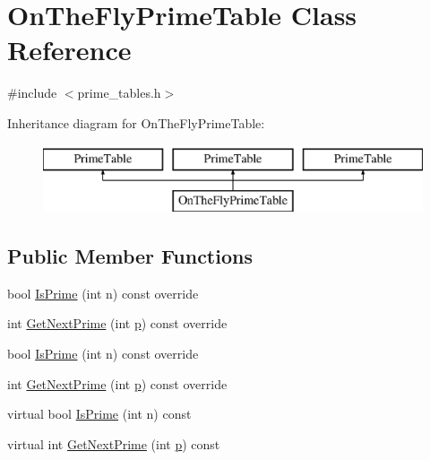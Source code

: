 \hypertarget{class_on_the_fly_prime_table}{}\section{On\+The\+Fly\+Prime\+Table Class Reference}
\label{class_on_the_fly_prime_table}


{\ttfamily \#include $<$prime\+\_\+tables.\+h$>$}

Inheritance diagram for On\+The\+Fly\+Prime\+Table\+:\begin{figure}[H]
\begin{center}
\leavevmode
\includegraphics[height=2.000000cm]{d3/d31/class_on_the_fly_prime_table}
\end{center}
\end{figure}
\subsection*{Public Member Functions}
\begin{DoxyCompactItemize}
\item 
bool \mbox{\hyperlink{class_on_the_fly_prime_table_ac8236514299e4558a5220c3e06f7f61a}{Is\+Prime}} (int n) const override
\item 
int \mbox{\hyperlink{class_on_the_fly_prime_table_a0f6f934f318407a812098e67584b60bf}{Get\+Next\+Prime}} (int \mbox{\hyperlink{_obj__test_2lib_2googletest-master_2googlemock_2test_2gmock-matchers__test_8cc_a6bc6b007533335efe02bafff799ec64c}{p}}) const override
\item 
bool \mbox{\hyperlink{class_on_the_fly_prime_table_ac8236514299e4558a5220c3e06f7f61a}{Is\+Prime}} (int n) const override
\item 
int \mbox{\hyperlink{class_on_the_fly_prime_table_a0f6f934f318407a812098e67584b60bf}{Get\+Next\+Prime}} (int \mbox{\hyperlink{_obj__test_2lib_2googletest-master_2googlemock_2test_2gmock-matchers__test_8cc_a6bc6b007533335efe02bafff799ec64c}{p}}) const override
\item 
virtual bool \mbox{\hyperlink{class_on_the_fly_prime_table_a1d49b78f79e018441289e79d75680067}{Is\+Prime}} (int n) const
\item 
virtual int \mbox{\hyperlink{class_on_the_fly_prime_table_a5a4644fedd95d33136723f33b9302bfc}{Get\+Next\+Prime}} (int \mbox{\hyperlink{_obj__test_2lib_2googletest-master_2googlemock_2test_2gmock-matchers__test_8cc_a6bc6b007533335efe02bafff799ec64c}{p}}) const
\end{DoxyCompactItemize}


